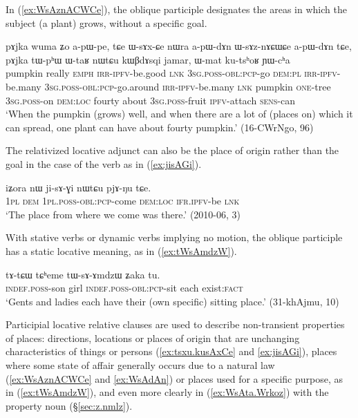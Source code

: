 In (\ref{ex:WsAznACWCe}), the oblique participle designates the areas in which the subject (a plant) grows, without a specific goal.

\begin{exe}
\ex \label{ex:WsAznACWCe}
\gll  pɤjka wuma ʑo a-pɯ-pe, tɕe ɯ-sɤx-ɕe nɯra a-pɯ-dɤn ɯ-sɤz-nɤɕɯɕe a-pɯ-dɤn tɕe, pɤjka tɯ-pʰɯ ɯ-taʁ nɯtɕu kɯβdɤsqi jamar, ɯ-mat ku-tsʰoʁ ɲɯ-cʰa \\
pumpkin really \textsc{emph} \textsc{irr}-\textsc{ipfv}-be.good \textsc{lnk} \textsc{3sg}.\textsc{poss}-\textsc{obl}:\textsc{pcp}-go \textsc{dem}:\textsc{pl} \textsc{irr}-\textsc{ipfv}-be.many \textsc{3sg}.\textsc{poss}-\textsc{obl}:\textsc{pcp}-go.around \textsc{irr}-\textsc{ipfv}-be.many  \textsc{lnk} pumpkin \textsc{one}-tree \textsc{3sg}.\textsc{poss}-on \textsc{dem}:\textsc{loc} fourty about \textsc{3sg}.\textsc{poss}-fruit \textsc{ipfv}-attach \textsc{sens}-can \\
\glt `When the pumpkin (grows) well, and when there are a lot of (places on) which it can spread, one plant can have about fourty pumpkin.' (16-CWrNgo, 96)
\end{exe}

The relativized locative adjunct can also be the place of origin rather than the goal in the case of the verb  as in (\ref{ex:jisAGi}).

\begin{exe}
\ex \label{ex:jisAGi}
\gll  iʑora nɯ ji-sɤ-ɣi nɯtɕu pjɤ-ŋu tɕe. \\
\textsc{1pl} \textsc{dem} \textsc{1pl}.\textsc{poss}-\textsc{obl}:\textsc{pcp}-come \textsc{dem}:\textsc{loc} \textsc{ifr}.\textsc{ipfv}-be \textsc{lnk} \\
\glt  `The place from where we come was there.' (2010-06, 3)
\end{exe}

With stative verbs or dynamic verbs implying no motion, the oblique participle has a static locative meaning, as in  (\ref{ex:tWsAmdzW}).
 

\begin{exe}
\ex \label{ex:tWsAmdzW}
\gll tɤ-tɕɯ tɕʰeme tɯ-sɤ-ɤmdzɯ ʑaka tu. \\
\textsc{indef}.\textsc{poss}-son girl \textsc{indef}.\textsc{poss}-\textsc{obl}:\textsc{pcp}-sit each exist:\textsc{fact} \\ 
\glt `Gents and ladies each have their (own specific) sitting place.' (31-khAjmu, 10)
\end{exe}


Participial locative relative clauses are used to describe non-transient properties of places: directions, locations or places of origin that are unchanging characteristics of things or persons (\ref{ex:tsxu.kusAxCe} and \ref{ex:jisAGi}), places where some state of affair generally occurs due to a natural law (\ref{ex:WsAznACWCe} and \ref{ex:WsAdAn}) or places used for a specific purpose, as in (\ref{ex:tWsAmdzW}), and even more clearly in (\ref{ex:WsAta.Wrkoz}) with the property noun    (§\ref{sec:z.nmlz}).

